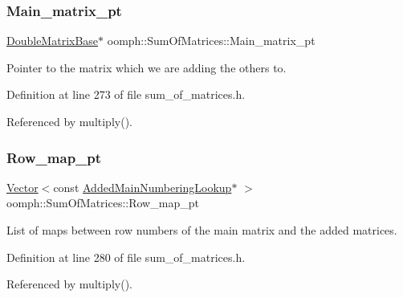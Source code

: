 \subsubsection{\texorpdfstring{Main\+\_\+matrix\+\_\+pt}{Main\_matrix\_pt}}
{\footnotesize\ttfamily \hyperlink{classoomph_1_1DoubleMatrixBase}{Double\+Matrix\+Base}$\ast$ oomph\+::\+Sum\+Of\+Matrices\+::\+Main\+\_\+matrix\+\_\+pt\hspace{0.3cm}{\ttfamily [private]}}



Pointer to the matrix which we are adding the others to. 



Definition at line 273 of file sum\+\_\+of\+\_\+matrices.\+h.



Referenced by multiply().

\mbox{\label{classoomph_1_1SumOfMatrices_ada8abf72cfd7c3c74b2f656191f06a31}} 
\subsubsection{\texorpdfstring{Row\+\_\+map\+\_\+pt}{Row\_map\_pt}}
{\footnotesize\ttfamily \hyperlink{classoomph_1_1Vector}{Vector}$<$const \hyperlink{classoomph_1_1AddedMainNumberingLookup}{Added\+Main\+Numbering\+Lookup}$\ast$ $>$ oomph\+::\+Sum\+Of\+Matrices\+::\+Row\+\_\+map\+\_\+pt\hspace{0.3cm}{\ttfamily [private]}}



List of maps between row numbers of the main matrix and the added matrices. 



Definition at line 280 of file sum\+\_\+of\+\_\+matrices.\+h.



Referenced by multiply().

\mbox{\label{classoomph_1_1SumOfMatrices_abba55a2123febe3b1bb89ee010a56eb5}} 
